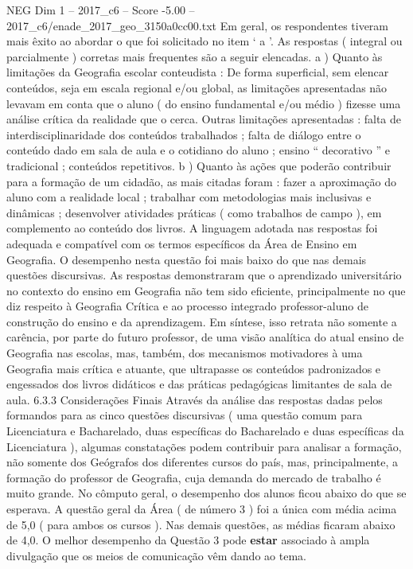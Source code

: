 \begin{textsample}{NEG Dim 1 – 2017\_c6 – Score -5.00 – 2017\_c6/enade\_2017\_geo\_3150a0cc00.txt}
Em geral, os respondentes tiveram mais êxito ao abordar o que foi solicitado no item ‘ a ’.
As respostas ( integral ou parcialmente ) corretas mais frequentes são a seguir elencadas. a ) Quanto às limitações da Geografia escolar conteudista : De forma superficial, sem elencar conteúdos, seja em escala regional e/ou global, as limitações apresentadas não levavam em conta que o aluno ( do ensino fundamental e/ou médio ) fizesse uma análise crítica da realidade que o cerca.
Outras limitações apresentadas : falta de interdisciplinaridade dos conteúdos trabalhados ; falta de diálogo entre o conteúdo dado em sala de aula e o cotidiano do aluno ; ensino “ decorativo ” e tradicional ; conteúdos repetitivos. b ) Quanto às ações que poderão contribuir para a formação de um cidadão, as mais citadas foram : fazer a aproximação do aluno com a realidade local ; trabalhar com metodologias mais inclusivas e dinâmicas ; desenvolver atividades práticas ( como trabalhos de campo ), em complemento ao conteúdo dos livros.
A linguagem adotada nas respostas foi adequada e compatível com os termos específicos da Área de Ensino em Geografia.
O desempenho nesta questão foi mais baixo do que nas demais questões discursivas.
As respostas demonstraram que o aprendizado universitário no contexto do ensino em Geografia não tem sido eficiente, principalmente no que diz respeito à Geografia Crítica e ao processo integrado professor-aluno de construção do ensino e da aprendizagem.
Em síntese, isso retrata não somente a carência, por parte do futuro professor, de uma visão analítica do atual ensino de Geografia nas escolas, mas, também, dos mecanismos motivadores à uma Geografia mais crítica e atuante, que ultrapasse os conteúdos padronizados e engessados dos livros didáticos e das práticas pedagógicas limitantes de sala de aula. 6.3.3 Considerações Finais Através da análise das respostas dadas pelos formandos para as cinco questões discursivas ( uma questão comum para Licenciatura e Bacharelado, duas específicas do Bacharelado e duas específicas da Licenciatura ), algumas constatações podem contribuir para analisar a formação, não somente dos Geógrafos dos diferentes cursos do país, mas, principalmente, a formação do professor de Geografia, cuja demanda do mercado de trabalho é muito grande.
No cômputo geral, o desempenho dos alunos ficou abaixo do que se esperava.
A questão geral da Área ( de número 3 ) foi a única com média acima de 5,0 ( para ambos os cursos ).
Nas demais questões, as médias ficaram abaixo de 4,0.
O melhor desempenho da Questão 3 pode \textbf{estar} associado à ampla divulgação que os meios de comunicação vêm dando ao tema.

\end{textsample}
